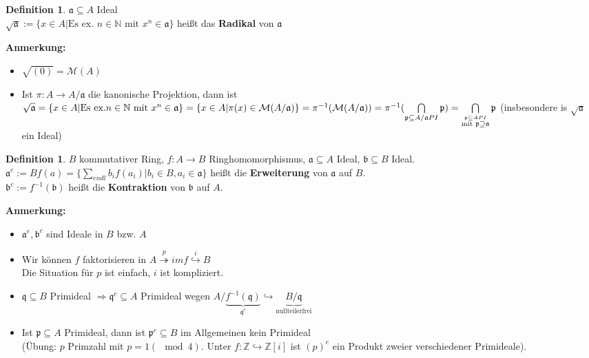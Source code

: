 \documentclass[10pt,a4paper,numbers=endperiod]{scrreprt}
\theoremstyle{definition}
\newtheorem{defi}[satz]{Definition}
\def\NN{{\mathbb N}}
\def\ZZ{{\mathbb Z}}
\begin{document}
\begin{defi}
	$\mathfrak{a} \subseteq A$ Ideal\\
	$\sqrt{\mathfrak{a}} := \{x \in A| \text{Es ex. } n \in \NN \text{ mit } x^n \in \mathfrak{a}\}$ heißt das \textbf{Radikal} von $\mathfrak{a}$
\end{defi}

\textbf{Anmerkung:} \begin{itemize}
	\item $\sqrt{(0)} = \mathcal{M}(A)$
	\item Ist $\pi: A \to A/\mathfrak{a}$ die kanonische Projektion, dann ist\\
	$\sqrt{\mathfrak{a}} = \{x \in A| \text{Es ex.} n \in \NN \text{ mit } x^n \in \mathfrak{a}\} = \{x \in A| \pi(x) \in \mathcal{M}(A/\mathfrak{a})\}\\ = \pi^{-1}(\mathcal{M}(A/\mathfrak{a})) = \pi^{-1}(\bigcap\limits_{\mathfrak{p} \subseteq A/\mathfrak{a} PI} \mathfrak{p}) = \bigcap\limits_{\stackrel{\mathfrak{p} \subseteq A PI}{\text{mit } \mathfrak{p} \supseteq \mathfrak{a}}} \mathfrak{p}$ \hspace*{3mm} (insbesondere is $\sqrt{\mathfrak{a}}$ ein Ideal)
\end{itemize}

\begin{defi}
	$B$ kommutativer Ring, $f: A \to B$ Ringhomomorphismus, $\mathfrak{a} \subseteq A$ Ideal, $\mathfrak{b} \subseteq B$ Ideal.\\
	$\mathfrak{a}^e := Bf(a) = \{\sum\limits_{endl} b_i f(a_i)| b_i \in B, a_i \in \mathfrak{a}\}$ heißt die \textbf{Erweiterung} von $\mathfrak{a}$ auf $B$.\\
	$\mathfrak{b}^c := f^{-1}(\mathfrak{b})$ heißt die \textbf{Kontraktion} von $\mathfrak{b}$ auf $A$.
\end{defi}

\textbf{Anmerkung:} \begin{itemize}
	\item $\mathfrak{a}^e, \mathfrak{b}^c$ sind Ideale in $B$ bzw. $A$
	\item Wir können $f$ faktorisieren in $A \overset{p}{\twoheadrightarrow} im f \overset{i}{\hookrightarrow} B$\\
	Die Situation für $p$ ist einfach, $i$ ist kompliziert.
	\item $\mathfrak{q} \subseteq B$ Primideal $\Rightarrow \mathfrak{q}^c \subseteq A$ Primideal wegen $A/\underbrace{f^{-1}(\mathfrak{q})}_{\mathfrak{q}^c} \hookrightarrow \underbrace{B/\mathfrak{q}}_{\text{nullteilerfrei}}$ 
	\item Ist $\mathfrak{p} \subseteq A$ Primideal, dann ist $\mathfrak{p}^e \subseteq B$ im Allgemeinen kein Primideal\\
	(Übung: $p$ Primzahl mit $p = 1(\mod 4)$. Unter $f: \ZZ \hookrightarrow \ZZ[i]$ ist $(p)^e$ ein Produkt zweier verschiedener Primideale).
\end{itemize}
\end{document}
